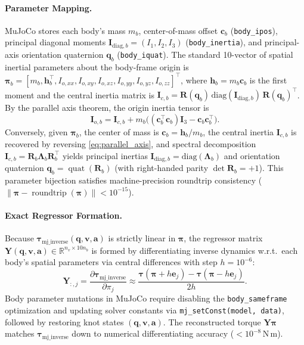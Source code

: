 \documentclass[11pt,a4paper]{article}
\newcommand{\R}{\mathbb{R}}
\newcommand{\bq}{\mathbf{q}}
\newcommand{\bv}{\mathbf{v}}
\newcommand{\ba}{\mathbf{a}}
\newcommand{\bh}{\mathbf{h}}
\newcommand{\bY}{\mathbf{Y}}
\newcommand{\bpi}{\boldsymbol{\pi}}
\begin{document}
\paragraph{Parameter Mapping.}
MuJoCo stores each body's mass $m_b$, center-of-mass offset $\mathbf{c}_b$ (\texttt{body\_ipos}),
principal diagonal moments $\mathbf{I}_{\text{diag}, b}=(I_{1}, I_{2}, I_{3})$ (\texttt{body\_inertia}),
and principal-axis orientation quaternion $\mathbf{q}_b$ (\texttt{body\_iquat}).
The standard 10-vector of spatial inertial parameters about the body-frame origin is
$\bpi_b = [m_b, \bh_b^{\!\top}, I_{o,xx}, I_{o,xy}, I_{o,xz}, I_{o,yy}, I_{o,yz}, I_{o,zz}]^{\!\top}$,
where $\bh_b = m_b \mathbf{c}_b$ is the first moment and the central inertia matrix is
$\mathbf{I}_{c, b} = \mathbf{R}(\mathbf{q}_b)\,\mathrm{diag}(\mathbf{I}_{\text{diag}, b})\,\mathbf{R}(\mathbf{q}_b)^{\!\top}$.
By the parallel axis theorem, the origin inertia tensor is
\begin{equation}
  \mathbf{I}_{o, b} = \mathbf{I}_{c, b} + m_b \bigl( (\mathbf{c}_b^{\!\top}\mathbf{c}_b)\mathbf{I}_3 - \mathbf{c}_b \mathbf{c}_b^{\!\top} \bigr) .
  \label{eq:parallel_axis}
\end{equation}
Conversely, given $\bpi_b$, the center of mass is $\mathbf{c}_b = \bh_b / m_b$, the central inertia $\mathbf{I}_{c,b}$ is recovered by reversing \eqref{eq:parallel_axis}, and spectral decomposition $\mathbf{I}_{c,b}=\mathbf{R}_b\boldsymbol{\Lambda}_b\mathbf{R}_b^{\!\top}$ yields principal inertias $\mathbf{I}_{\text{diag},b}=\mathrm{diag}(\boldsymbol{\Lambda}_b)$ and orientation quaternion $\mathbf{q}_b=\operatorname{quat}(\mathbf{R}_b)$ (with right-handed parity $\det\mathbf{R}_b=+1$).  This parameter bijection satisfies machine-precision roundtrip consistency ($\lVert\bpi - \operatorname{roundtrip}(\bpi)\rVert < 10^{-15}$).

\paragraph{Exact Regressor Formation.}
Because $\boldsymbol{\tau}_{\text{mj\_inverse}}(\bq, \bv, \ba)$ is strictly linear in $\bpi$, the regressor matrix $\bY(\bq,\bv,\ba)\in\R^{n_v\times 10 n_b}$ is formed by differentiating inverse dynamics w.r.t.\ each body's spatial parameters via central differences with step $h=10^{-6}$:
\begin{equation}
  \bY_{:, j} = \frac{\partial \boldsymbol{\tau}_{\text{mj\_inverse}}}{\partial \pi_j}
  \approx \frac{\boldsymbol{\tau}(\bpi + h\mathbf{e}_j) - \boldsymbol{\tau}(\bpi - h\mathbf{e}_j)}{2h} .
\end{equation}
Body parameter mutations in MuJoCo require disabling the \texttt{body\_sameframe} optimization and updating solver constants via \texttt{mj\_setConst(model, data)}, followed by restoring knot states $(\bq, \bv, \ba)$.  The reconstructed torque $\bY\bpi$ matches $\boldsymbol{\tau}_{\text{mj\_inverse}}$ down to numerical differentiating accuracy ($<10^{-8}\,\mathrm{N\,m}$).
\end{document}
